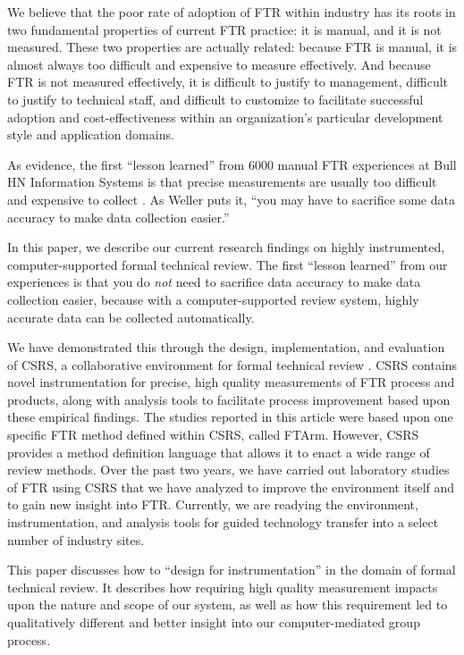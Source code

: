 We believe that the poor rate of adoption of FTR within industry has its
roots in two fundamental properties of current FTR practice: it is manual,
and it is not measured. These two properties are actually related: because
FTR is manual, it is almost always too difficult and expensive to measure
effectively.  And because FTR is not measured effectively, it is difficult
to justify to management, difficult to justify to technical staff, and
difficult to customize to facilitate successful adoption and
cost-effectiveness within an organization's particular development style
and application domains.

As evidence, the first ``lesson learned'' from 6000 manual FTR
experiences at Bull HN Information Systems is that precise measurements are
usually too difficult and expensive to collect \cite{Weller93}. As Weller
puts it, ``you may have to sacrifice some data accuracy to make data
collection easier.''

In this paper, we describe our current research findings on highly
instrumented, computer-supported formal technical review.  The first
``lesson learned'' from our experiences is that you do {\em not} need to
sacrifice data accuracy to make data collection easier, because with a
computer-supported review system, highly accurate data can be collected
automatically.

We have demonstrated this through the design, implementation, and
evaluation of CSRS, a collaborative environment for
formal technical review \cite{csdl-93-17,csdl-94-03}.  
CSRS contains novel instrumentation for precise,
high quality measurements of FTR process and products, along with analysis
tools to facilitate process improvement based upon these empirical
findings.  The studies reported in this article were based upon one
specific FTR method defined within CSRS, called
FTArm.  However,
CSRS provides a method definition language that allows it to enact a wide
range of review methods.  Over the past two years, we have carried out
laboratory studies of FTR using CSRS that we have analyzed to improve the
environment itself and to gain new insight into FTR. Currently, we are
readying the environment, instrumentation, and analysis tools for guided
technology transfer into a select number of industry sites.

This paper discusses how to ``design for instrumentation'' in the domain of
formal technical review.  It describes how requiring high quality
measurement impacts upon the nature and scope of our system, as well as how
this requirement led to qualitatively different and better insight into our
computer-mediated group process.

